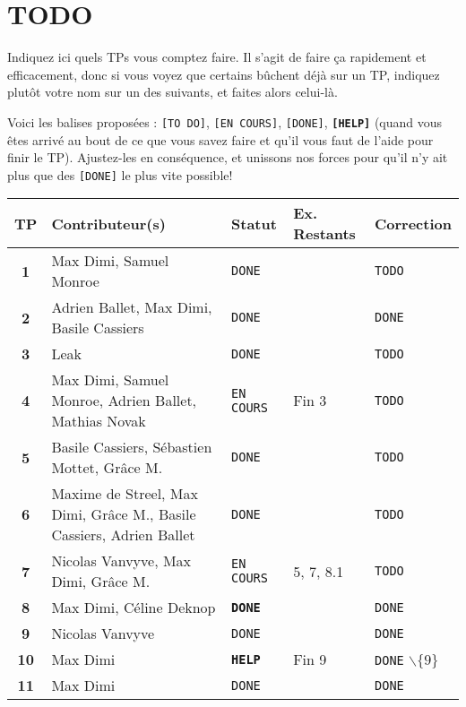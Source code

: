 \chapter*{TODO}

Indiquez ici quels TPs vous comptez faire. Il s'agit de faire ça rapidement et efficacement, donc si vous voyez que certains bûchent déjà sur un TP, indiquez plutôt votre nom sur un des suivants, et faites alors celui-là.

Voici les balises proposées : \texttt{[TO DO]}, \texttt{[EN COURS]}, \texttt{[DONE]}, \textbf{\texttt{[HELP]}} (quand vous êtes arrivé au bout de ce que vous savez faire et qu'il vous faut de l'aide pour finir le TP). Ajustez-les en conséquence, et unissons nos forces pour qu'il n'y ait plus que des \texttt{[DONE]} le plus vite possible!

\begin{center}
\begin{tabularx}{16cm}{|c|X|l|l|l|}
\hline
\rowcolor[gray]{0.8} \bf TP & \bf Contributeur(s) & \bf Statut & \bf Ex. Restants & \bf Correction \\
\hline
\bf 1 & Max Dimi, Samuel Monroe & \texttt{DONE} & & \texttt{TODO}\\
\hline
\bf 2 & Adrien Ballet, Max Dimi, Basile Cassiers& \texttt{DONE} & & \texttt{DONE}\\
\hline
\bf 3 & Leak & \texttt{DONE} &  & \texttt{TODO}\\
\hline
\bf 4 & Max Dimi, Samuel Monroe, Adrien Ballet, Mathias Novak & \texttt{EN COURS} & Fin 3 & \texttt{TODO}\\
\hline
\bf 5 & Basile Cassiers, Sébastien Mottet, Grâce M. & \texttt{DONE} & & \texttt{TODO}\\
\hline
\bf 6 & Maxime de Streel, Max Dimi, Grâce M., Basile Cassiers, Adrien Ballet & \texttt{DONE} & & \texttt{TODO}\\
\hline
\bf 7 & Nicolas Vanvyve, Max Dimi, Grâce M. & \texttt{EN COURS} & 5, 7, 8.1 & \texttt{TODO}\\
\hline
\bf 8 & Max Dimi, Céline Deknop & \textbf{\texttt{DONE}} &  & \texttt{DONE}\\
\hline
\bf 9 & Nicolas Vanvyve & \texttt{DONE} &  & \texttt{DONE} \\
\hline
\bf 10 & Max Dimi & \textbf{\texttt{HELP}} & Fin 9 & \texttt{DONE} $\backslash \{ 9 \}$ \\
\hline
\bf 11 & Max Dimi & \texttt{DONE} & & \texttt{DONE}\\
\hline
\end{tabularx}
\end{center}
